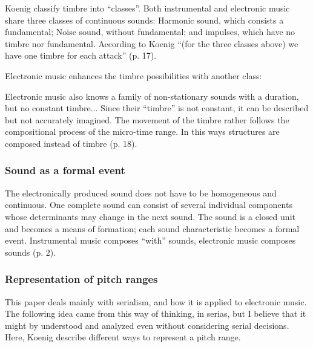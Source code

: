 \documentclass[a4paper,11pt]{article}
\newenvironment{MyShadequote}[1][]
    {\begin{mdframed}[style=MyShadeQuoteStyle,#1]}
    {\end{mdframed}}
\begin{document}
Koenig classify timbre into ``classes''.
Both instrumental and electronic music share three classes of continuous sounds:
Harmonic sound, which consists a fundamental; Noise sound, without fundamental; and impulses, which have no timbre nor fundamental.
According to Koenig ``(for the three classes above) we have one timbre for each attack'' (p. 17).

Electronic music enhances the timbre possibilities with another class:

\begin{MyShadequote}
 Electronic music also knows a family of non-stationary sounds with a duration, but no constant timbre...
 Since their ``timbre'' is not constant, it can be described but not accurately imagined.
 The movement of the timbre rather follows the compositional process of the micro-time range.
 In this ways structures are composed instead of timbre (p. 18).
\end{MyShadequote}

\subsubsection{Sound as a formal event}
\label{subs:koenig:event}

\begin{MyShadequote}
  The electronically produced sound does not have to be homogeneous and continuous.
  One complete sound can consist of several individual components whose determinants may change in the next sound.
  The sound is a closed unit and becomes a means of formation;
  each sound characteristic becomes a formal event.
  Instrumental music composes ``with'' sounds, electronic music composes sounds (p. 2).
\end{MyShadequote}

\subsubsection{Representation of pitch ranges}
\label{subs:koenig:pitch_ranges}

This paper deals mainly with serialism, and how it is applied to electronic music.
The following idea came from this way of thinking, in serias, but I believe that it might by understood and analyzed even without considering serial decisions.
Here, Koenig describe different ways to represent a pitch range.
\end{document}
